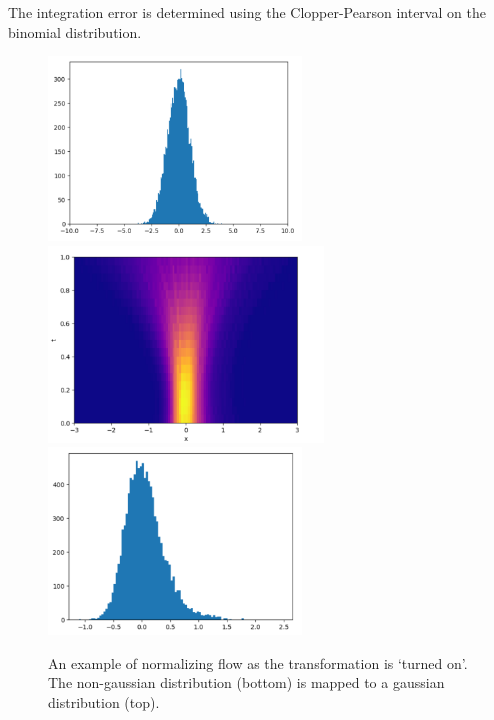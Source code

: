 The integration error is determined using the Clopper-Pearson interval on the binomial distribution.
\begin{figure}[ht]
	\centering
	\includegraphics[width=0.6\textwidth]{plots/t0_gauss.png}
	\includegraphics[width=0.65\textwidth]{plots/flow_param.png}
	\includegraphics[width=0.6\textwidth]{plots/t=1.png}
	\caption{An example of normalizing flow as the transformation is `turned on'. The non-gaussian distribution (bottom) is mapped to a gaussian distribution (top).}
	\label{fig:NF}
\end{figure}
